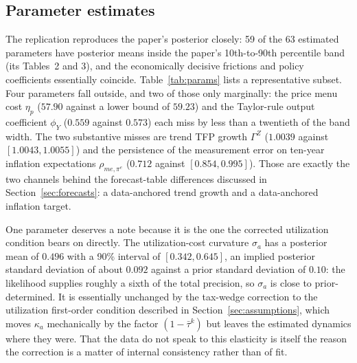 \documentclass[11pt]{article}
\theoremstyle{definition}
\begin{document}
\subsection{Parameter estimates}
The replication reproduces the paper's posterior closely: 59 of the 63 estimated parameters have
posterior means inside the paper's 10th-to-90th percentile band (its Tables~2 and 3), and the
economically decisive frictions and policy coefficients essentially coincide.
Table~\ref{tab:params} lists a representative subset. Four parameters fall outside, and two of those
only marginally: the price menu cost $\eta_p$ ($57.90$ against a lower bound of $59.23$) and the
Taylor-rule output coefficient $\phi_Y$ ($0.559$ against $0.573$) each miss by less than a twentieth of
the band width. The two substantive misses are trend TFP growth $\Gamma^Z$ ($1.0039$ against
$[1.0043,1.0055]$) and the persistence of the measurement error on ten-year inflation expectations
$\rho_{me,\pi^e}$ ($0.712$ against $[0.854,0.995]$). Those are exactly the two channels behind the
forecast-table differences discussed in Section~\ref{sec:forecasts}: a data-anchored trend growth and a
data-anchored inflation target.

One parameter deserves a note because it is the one the corrected utilization condition bears on
directly. The utilization-cost curvature $\sigma_a$ has a posterior mean of $0.496$ with a 90\% interval
of $[0.342,0.645]$, an implied posterior standard deviation of about $0.092$ against a prior standard
deviation of $0.10$: the likelihood supplies roughly a sixth of the total precision, so $\sigma_a$ is
close to prior-determined. It is essentially unchanged by the tax-wedge correction to the utilization
first-order condition described in Section~\ref{sec:assumptions}, which moves $\kappa_a$ mechanically by
the factor $(1-\bar\tau^k)$ but leaves the estimated dynamics where they were. That the data do not
speak to this elasticity is itself the reason the correction is a matter of internal consistency rather
than of fit.
\end{document}
